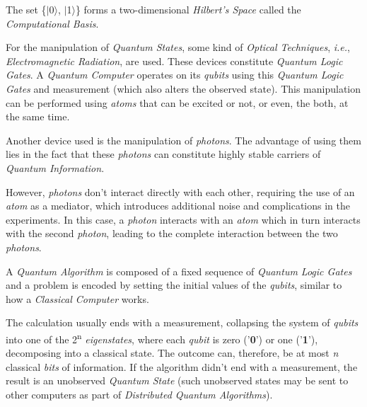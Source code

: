 \documentclass[conference]{IEEEtran}
\begin{document}
\vspace{4pt}

The set \{$\mid$0$\rangle$, $\mid$1$\rangle$\} forms a two-dimensional \textit{Hilbert's Space} called the \textit{Computational Basis}.

\vspace{4pt}

For the manipulation of \textit{Quantum States}, some kind of \textit{Optical Techniques}, \textit{i.e.}, \textit{Electromagnetic Radiation}, are used. These devices constitute \textit{Quantum Logic Gates}. A \textit{Quantum Computer} operates on its \textit{qubits} using this \textit{Quantum Logic Gates} and measurement (which also alters the observed state). This manipulation can be performed using \textit{atoms} that can be excited or not, or even, the both, at the same time.

\vspace{4pt}

Another device used is the manipulation of \textit{photons}. The advantage of using them lies in the fact that these \textit{photons} can constitute highly stable carriers of \textit{Quantum Information}.

\vspace{4pt}

However, \textit{photons} don't interact directly with each other, requiring the use of an \textit{atom} as a mediator, which introduces additional noise and complications in the experiments. In this case, a \textit{photon} interacts with an \textit{atom} which in turn interacts with the second \textit{photon}, leading to the complete interaction between the two \textit{photons}.

\vspace{4pt}

 A \textit{Quantum Algorithm} is composed of a fixed sequence of \textit{Quantum Logic Gates} and a problem is encoded by setting the initial values of the \textit{qubits}, similar to how a \textit{Classical Computer} works.
 
 \vspace{4pt}
 
 The calculation usually ends with a measurement, collapsing the system of \textit{qubits} into one of the 2\textsuperscript{n} \textit{eigenstates}, where each \textit{qubit} is zero ('\textbf{0}') or one ('\textbf{1}'), decomposing into a classical state. The outcome can, therefore, be at most \textit{n} classical \textit{bits} of information. If the algorithm didn't end with a measurement, the result is an unobserved \textit{Quantum State} (such unobserved states may be sent to other computers as part of \textit{Distributed Quantum Algorithms}).
\end{document}
